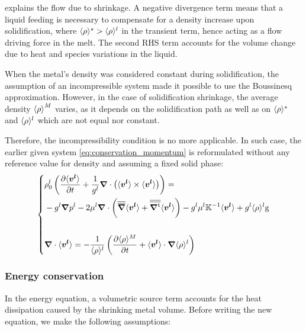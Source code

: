  explains the flow due to shrinkage. 
A negative divergence term means that a liquid feeding 
is necessary to compensate for a density increase upon solidification, where $\langle \rho \rangle^s > \langle \rho \rangle^l$ in the transient term, 
hence acting as a flow driving force in the melt.
The second RHS term accounts for the volume change 
due to heat and species variations in the liquid.

When the metal's density was considered constant during solidification, 
the assumption of an incompressible system made it possible to
use the Boussinesq approximation. However, in the case of solidification shrinkage, 
the average density ${\langle \rho \rangle}^M$ varies, as it depends on the solidification 
path as well as on $\langle \rho \rangle^s$ and $\langle \rho \rangle^l$ which are not equal nor constant.

Therefore, the incompressibility condition is no more applicable. In such case, 
the earlier given system \cref{eq:conservation_momentum} is reformulated without 
any reference value for density and assuming a fixed solid phase:
\begin{equation}
\label{eq:momentum_balance_metal}
   \left\{
   \begin{aligned}
      & \rho_{0}^{l} \left( \frac{\partial  \langle \boldsymbol{v^l} \rangle }{\partial t}  + \frac{1}{{g^l}} \boldsymbol{\nabla} \cdot \left( \langle \boldsymbol{v^l} \rangle \times \langle \boldsymbol{v^l} \rangle \right) \right) = \\
	  &- {g^l}\boldsymbol{\nabla} {p^l} - 2 \mu^l \boldsymbol{\nabla} \cdot \left( {\overline{\overline{\boldsymbol{\nabla}}}} \langle \boldsymbol{v^l} \rangle + {\overline{\overline{\boldsymbol{\nabla^\text{t}}}}} \langle \boldsymbol{v^l} \rangle \right)
	  - {g^l} \mu^l \mathbb{K}^{-1} \langle \boldsymbol{v^l} \rangle + {g^l} \langle \rho \rangle^l \boldsymbol{\text{g}}\\ \\
      & \boldsymbol{\nabla} \cdot \langle \boldsymbol{v^l} \rangle = -\frac{1}{\langle \rho \rangle^l} \left( \frac{\partial \langle \rho \rangle^M}{\partial t}  + \langle \boldsymbol{v^l} \rangle \cdot  \boldsymbol{\nabla} \langle \rho \rangle^l \right)
    \end{aligned}
    \right.
\end{equation}
\subsubsection{Energy conservation}
In the energy equation, a volumetric source term accounts for the heat dissipation 
caused by the shrinking metal volume. Before writing the new equation, we make the following assumptions:

